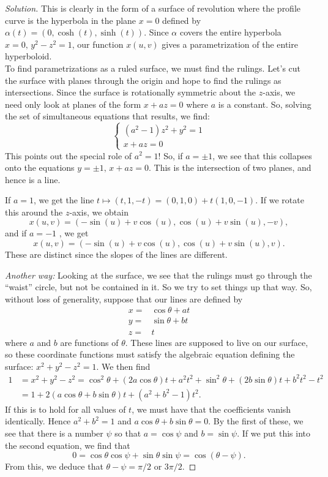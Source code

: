 \documentclass[Shifrin_Solutions_Spring_2015]{subfiles}
\begin{document}
\begin{proof}[Solution] This is clearly in the form of a surface of revolution where the profile curve is the hyperbola in the plane $x=0$ defined by $\alpha(t) = (0 ,\cosh(t), \sinh(t))$.  Since $\alpha$ covers the entire hyperbola $x=0, \,  y^2-z^2=1$, our function $x(u,v)$ gives a parametrization of the entire hyperboloid.\\

To find parametrizations as a ruled surface, we must find the rulings. Let's cut the surface with planes through the origin and hope to find the rulings as intersections. Since the surface is rotationally symmetric about the $z$-axis, we need only look at planes of the form $x+az=0$ where $a$ is a constant. So, solving the set of simultaneous equations that results, we find:
\[
\left\{ \begin{array}{l} (a^2-1)z^2 + y^2 = 1 \\ x+az = 0 \end{array}\right.
\]
This points out the special role of $a^2=1$! So, if $a = \pm 1$, we see that this collapses onto the equations $y = \pm 1, \, x+az=0$. This is the intersection of two planes, and hence is a line.

If $a=1$, we get the line $t \mapsto (t,1,-t)= (0,1,0) + t(1,0,-1)$. If we rotate this around the $z$-axis, we obtain
\[
x(u,v) = \left( -\sin(u) + v\cos(u) , \cos(u) + v \sin(u) , -v\right),
\]
and if $a=-1$ , we get
\[
x(u,v) = \left( -\sin(u) + v\cos(u) , \cos(u) + v \sin(u) , v\right) .
\]
These are distinct since the slopes of the lines are different. \\


\noindent\emph{Another way:} Looking at the surface, we see that the rulings must go through the ``waist'' circle, but not be contained in it. So we try to set things up that way. So, without loss of generality, suppose that our lines are defined by
\begin{align*}
x = &\cos\theta + a t \\
y = &\sin \theta + b t \\
z = &t
\end{align*}
where $a$ and $b$ are functions of $\theta$. These lines are supposed to live on our surface, so these coordinate functions must satisfy the algebraic equation defining the surface: $x^2+y^2-z^2 = 1$. We then find
\[
\begin{split}
1 & = x^2+y^2-z^2  = \cos^2\theta + (2a\cos\theta) t  + a^2 t^2 + \sin^2\theta + (2b\sin\theta) t + b^2 t^2 - t^2\\
	&= 1+ 2(a\cos\theta + b\sin\theta) t + (a^2+b^2-1)t^2.
\end{split}
\]
If this is to hold for all values of $t$, we must have that the coefficients vanish identically. Hence $a^2+b^2=1$ and $a\cos\theta +b\sin\theta =0$. By the first of these, we see that there is a number $\psi$ so that $a = \cos \psi$ and $b=\sin \psi$. If we put this into the second equation, we find that
\[
0 = \cos\theta\cos\psi + \sin\theta\sin\psi = \cos(\theta-\psi).
\]
From this, we deduce that $\theta-\psi = \pi/2$ or $3\pi/2$.


\end{proof}
\end{document}
